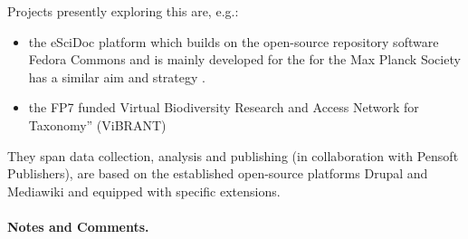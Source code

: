 \documentclass{llncs}
\begin{document}
Projects presently exploring this are, e.g.:

\begin{itemize}
  \item the eSciDoc platform which builds on the open-source
    repository software Fedora Commons \cite{Feudora} and is mainly
    developed for the for the Max Planck Society has a similar aim and
    strategy \cite{Dreyer}.
  \item the FP7 funded Virtual Biodiversity Research and Access
    Network for Taxonomy'' (ViBRANT) \cite{vbrant,Roberts,Blagoderov}
\end{itemize}

They span data collection, analysis and publishing (in collaboration
with Pensoft Publishers), are based on the established open-source
platforms Drupal \cite{Drupal} and Mediawiki \cite{MediaWiki} and
equipped with specific extensions.

\paragraph{Notes and Comments.}
\end{document}
